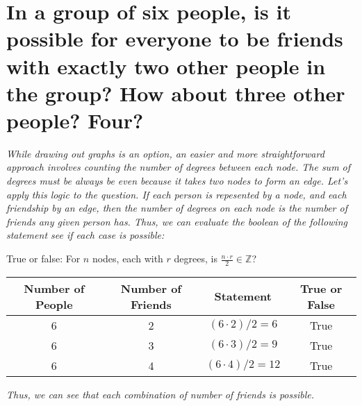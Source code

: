 \documentclass{article}
\begin{document}
\section{In a group of six people, is it possible for everyone
    to be friends with exactly two other people in the group?
    How about three other people? Four?}
\hspace{1cm}\textit{While drawing out graphs is an option, an
    easier and more straightforward approach involves counting
    the number of degrees between each node. The sum of degrees
    must be always be even because it takes two nodes to form
    an edge. Let's apply this logic to the question. If each person
    is repesented by a node, and each friendship by an edge, then the
    number of degrees on each node is the number of friends any given
    person has. Thus, we can evaluate the boolean of the following
    statement see if each case is possible:}
\begin{center}
    \large{True or false: For $n$ nodes, each with $r$ degrees, is 
    $\frac{n\cdot r}{2} \in \mathbb{Z}$?} \\
    \vspace{0.25cm}
    \normalsize{}
    \begin{tabular}{|c|c|c|c|}
        \hline
        Number of People & Number of Friends & Statement & True or False \\
        \hline
        6 & 2 & $(6\cdot 2)/2 = 6$ & True \\
        6 & 3 & $(6\cdot 3)/2 = 9$ & True \\
        6 & 4 & $(6\cdot 4)/2 = 12$ & True \\
        \hline
    \end{tabular}
\end{center}
\hspace{1cm}\textit{Thus, we can see that each combination of number
    of friends is possible.}
\clearpage

\end{document}

